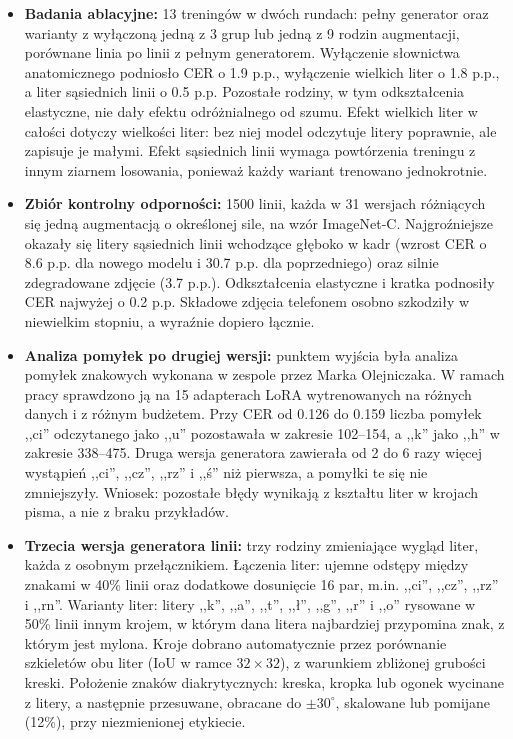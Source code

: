 \begin{itemize}
	\item \textbf{Badania ablacyjne:} 13 treningów w dwóch rundach:
	pełny generator oraz warianty z wyłączoną jedną z 3 grup lub jedną
	z 9 rodzin augmentacji, porównane linia po linii z pełnym generatorem. Wyłączenie słownictwa
	anatomicznego podniosło CER o 1.9 p.p., wyłączenie wielkich liter
	o 1.8 p.p., a liter sąsiednich linii o 0.5 p.p. Pozostałe rodziny,
	w tym odkształcenia elastyczne, nie dały efektu odróżnialnego od szumu.
	Efekt wielkich liter w całości dotyczy wielkości liter: bez niej model
	odczytuje litery poprawnie, ale zapisuje je małymi. Efekt sąsiednich
	linii wymaga powtórzenia treningu z innym ziarnem losowania, ponieważ
	każdy wariant trenowano jednokrotnie.

	\item \textbf{Zbiór kontrolny odporności:} 1500 linii, każda w 31
	wersjach różniących się jedną augmentacją o określonej sile, na wzór
	ImageNet-C. Najgroźniejsze okazały się litery sąsiednich linii wchodzące
	głęboko w kadr (wzrost CER o 8.6 p.p. dla nowego modelu i 30.7 p.p.
	dla poprzedniego) oraz silnie zdegradowane zdjęcie (3.7 p.p.).
	Odkształcenia elastyczne i kratka podnosiły CER najwyżej o 0.2 p.p.
	Składowe zdjęcia telefonem osobno szkodziły w niewielkim stopniu,
	a wyraźnie dopiero łącznie.

	\item \textbf{Analiza pomyłek po drugiej wersji:} punktem wyjścia była
	analiza pomyłek znakowych wykonana w zespole przez Marka Olejniczaka.
	W ramach pracy sprawdzono ją na 15 adapterach LoRA wytrenowanych na
	różnych danych i z różnym budżetem. Przy CER od 0.126 do 0.159 liczba
	pomyłek ,,ci'' odczytanego jako ,,u'' pozostawała w zakresie 102--154,
	a ,,k'' jako ,,h'' w zakresie 338--475. Druga wersja generatora zawierała
	od 2 do 6 razy więcej wystąpień ,,ci'', ,,cz'', ,,rz'' i ,,ś'' niż
	pierwsza, a pomyłki te się nie zmniejszyły. Wniosek: pozostałe błędy
	wynikają z kształtu liter w krojach pisma, a nie z braku przykładów.

	\item \textbf{Trzecia wersja generatora linii:} trzy rodziny zmieniające
	wygląd liter, każda z osobnym przełącznikiem. Łączenia liter: ujemne
	odstępy między znakami w 40\% linii oraz dodatkowe dosunięcie 16 par,
	m.in. ,,ci'', ,,cz'', ,,rz'' i ,,rn''. Warianty liter: litery ,,k'',
	,,a'', ,,t'', ,,ł'', ,,g'', ,,r'' i ,,o'' rysowane w 50\% linii innym
	krojem, w którym dana litera najbardziej przypomina znak, z którym jest
	mylona. Kroje dobrano automatycznie przez porównanie szkieletów obu liter
	(IoU w ramce $32 \times 32$), z warunkiem zbliżonej grubości kreski.
	Położenie znaków diakrytycznych: kreska, kropka lub ogonek wycinane
	z litery, a następnie przesuwane, obracane do $\pm 30^\circ$, skalowane
	lub pomijane (12\%), przy niezmienionej etykiecie.


\end{itemize}
